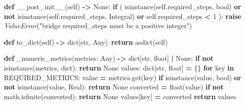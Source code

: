 \documentclass[
  chinese,
  11pt,
  letterpaper,
]{article}
\newenvironment{Shaded}{\begin{snugshade}}{\end{snugshade}}
\newcommand{\BuiltInTok}[1]{#1}
\newcommand{\ControlFlowTok}[1]{\textcolor[rgb]{0.13,0.29,0.53}{\textbf{#1}}}
\newcommand{\DecValTok}[1]{\textcolor[rgb]{0.00,0.00,0.81}{#1}}
\newcommand{\KeywordTok}[1]{\textcolor[rgb]{0.13,0.29,0.53}{\textbf{#1}}}
\newcommand{\NormalTok}[1]{#1}
\newcommand{\OperatorTok}[1]{\textcolor[rgb]{0.81,0.36,0.00}{\textbf{#1}}}
\newcommand{\PreprocessorTok}[1]{\textcolor[rgb]{0.56,0.35,0.01}{\textit{#1}}}
\newcommand{\StringTok}[1]{\textcolor[rgb]{0.31,0.60,0.02}{#1}}
\newcommand{\VariableTok}[1]{\textcolor[rgb]{0.00,0.00,0.00}{#1}}
\renewenvironment{Shaded}{\par\smallskip}{\par\smallskip}
\begin{document}
\begin{Shaded}
\begin{Highlighting}[]
    \KeywordTok{def}\NormalTok{ \_\_post\_init\_\_(}\VariableTok{self}\NormalTok{) }\OperatorTok{{-}\textgreater{}} \VariableTok{None}\NormalTok{:}
        \ControlFlowTok{if}\NormalTok{ (}
            \BuiltInTok{isinstance}\NormalTok{(}\VariableTok{self}\NormalTok{.required\_steps, }\BuiltInTok{bool}\NormalTok{)}
            \KeywordTok{or} \KeywordTok{not} \BuiltInTok{isinstance}\NormalTok{(}\VariableTok{self}\NormalTok{.required\_steps, Integral)}
            \KeywordTok{or} \VariableTok{self}\NormalTok{.required\_steps }\OperatorTok{\textless{}} \DecValTok{1}
\NormalTok{        ):}
            \ControlFlowTok{raise} \PreprocessorTok{ValueError}\NormalTok{(}\StringTok{"bridge required\_steps must be a positive integer"}\NormalTok{)}

    \KeywordTok{def}\NormalTok{ to\_dict(}\VariableTok{self}\NormalTok{) }\OperatorTok{{-}\textgreater{}} \BuiltInTok{dict}\NormalTok{[}\BuiltInTok{str}\NormalTok{, Any]:}
        \ControlFlowTok{return}\NormalTok{ asdict(}\VariableTok{self}\NormalTok{)}


\KeywordTok{def}\NormalTok{ \_numeric\_metrics(metrics: Any) }\OperatorTok{{-}\textgreater{}} \BuiltInTok{dict}\NormalTok{[}\BuiltInTok{str}\NormalTok{, }\BuiltInTok{float}\NormalTok{] }\OperatorTok{|} \VariableTok{None}\NormalTok{:}
    \ControlFlowTok{if} \KeywordTok{not} \BuiltInTok{isinstance}\NormalTok{(metrics, }\BuiltInTok{dict}\NormalTok{):}
        \ControlFlowTok{return} \VariableTok{None}
\NormalTok{    values: }\BuiltInTok{dict}\NormalTok{[}\BuiltInTok{str}\NormalTok{, }\BuiltInTok{float}\NormalTok{] }\OperatorTok{=}\NormalTok{ \{\}}
    \ControlFlowTok{for}\NormalTok{ key }\KeywordTok{in}\NormalTok{ REQUIRED\_METRICS:}
\NormalTok{        value }\OperatorTok{=}\NormalTok{ metrics.get(key)}
        \ControlFlowTok{if} \BuiltInTok{isinstance}\NormalTok{(value, }\BuiltInTok{bool}\NormalTok{) }\KeywordTok{or} \KeywordTok{not} \BuiltInTok{isinstance}\NormalTok{(value, Real):}
            \ControlFlowTok{return} \VariableTok{None}
\NormalTok{        converted }\OperatorTok{=} \BuiltInTok{float}\NormalTok{(value)}
        \ControlFlowTok{if} \KeywordTok{not}\NormalTok{ math.isfinite(converted):}
            \ControlFlowTok{return} \VariableTok{None}
\NormalTok{        values[key] }\OperatorTok{=}\NormalTok{ converted}
    \ControlFlowTok{return}\NormalTok{ values}



\end{Highlighting}
\end{Shaded}
\end{document}
